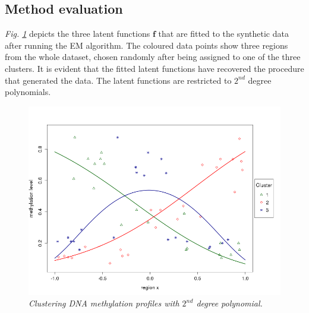 \subsection{Method evaluation} \label{meth-synth-method-subsect}
\emph{Fig. \ref{probit-2nd-pic}} depicts the three latent functions $\mathbf{f}$ that are fitted to the synthetic data after running the EM algorithm. The coloured data points show three regions from the whole dataset, chosen randomly after being assigned to one of the three clusters. It is evident that the fitted latent functions have recovered the procedure that generated the data. The latent functions are restricted to $2^{nd}$ degree polynomials.
\begin{figure}[!ht]
\begin{center}
 \includegraphics[scale = 0.40]{images/probit2nd.png}
\caption{\emph{Clustering DNA methylation profiles with $2^{nd}$ degree polynomial.}}
\label{probit-2nd-pic}
\end{center}
\end{figure}


